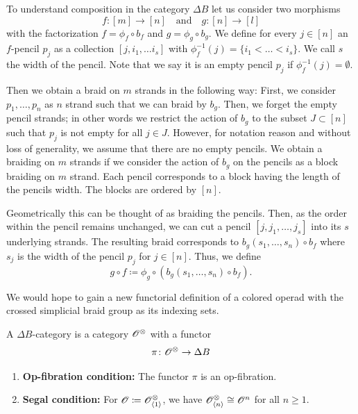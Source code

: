 \begin{rem}
    To understand composition in the category $\Delta B$ let us consider two morphisms
    \[
    f \colon [m] \to [n] \quad \text{and} \quad g \colon [n] \to [l]
    \]
    with the factorization $f = \phi_f \circ b_f$ and $g = \phi_g \circ b_g$. 
    We define for every $j \in [n]$ an $f$-pencil $p_j$ as a collection $[j, i_1, \dots i_s]$ 
    with $\phi_f^{-1}(j) = \{i_1 < \dots < i_s\}$. We call $s$ the width of the pencil. Note 
    that we say it is an empty pencil $p_j$ if $\phi_f^{-1}(j) = \emptyset$.
    
    Then we obtain a braid on $m$ strands in the following way:
    First, we consider $p_1, \dots, p_n$ as $n$ strand such that we can braid by $b_g$. Then, 
    we forget the empty pencil strands; in other words we restrict the action of $b_g$ to the 
    subset $J \subset [n]$ such that $p_j$ is not empty for all $j \in J$. However, for notation reason and without loss of generality, we assume that there are no empty pencils.    
    We obtain a braiding on $m$ strands if we consider the action of $b_g$ on the pencils as a 
    block braiding on $m$ strand. Each pencil corresponds to a block having the length of the 
    pencils width. The blocks are ordered by $[n]$.

    Geometrically this can be thought of as braiding the pencils. Then, as the order within the pencil remains unchanged, we can cut a pencil $[j, j_1, \dots, j_s]$ into its $s$ underlying strands. The resulting braid corresponds to $b_g(s_1, \dots, s_n) \circ b_f$ where $s_j$ is the width of the pencil $p_j$ for $j \in [n]$.
    Thus, we define
    \[
        g \circ f \coloneqq \phi_g \circ (b_g(s_1, \dots, s_n) \circ b_f).
    \]
\end{rem}

We would hope to gain a new functorial definition of a colored operad with the crossed simplicial braid group as its indexing sets. 
\begin{defin}
    A $\Delta B$-category is a category $\mathscr{O}^{\otimes}$ with a functor
    $$\pi \colon \mathscr{O}^{\otimes} \to \Delta B$$
    \begin{enumerate}
        \item \textbf{Op-fibration condition:} The functor $\pi$ is an op-fibration.
        \item \textbf{Segal condition:} For $\mathscr{O} \coloneqq \mathscr{O}^{\otimes}_{\langle 1 \rangle}$, 
        we have $\mathscr{O}^{\otimes}_{\langle n \rangle} \cong \mathscr{O}^n$ for all $n \geq 1$. 
    \end{enumerate}
\end{defin}

